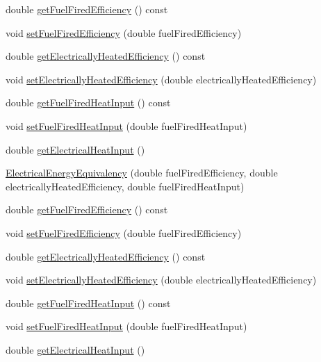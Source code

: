 \begin{DoxyCompactItemize}
\item 
double \hyperlink{class_electrical_energy_equivalency_adc8def25354f6ba8c3479040507b0ea6}{get\+Fuel\+Fired\+Efficiency} () const
\item 
void \hyperlink{class_electrical_energy_equivalency_ac73a4dadfeeff737a24b58e805ce9a3a}{set\+Fuel\+Fired\+Efficiency} (double fuel\+Fired\+Efficiency)
\item 
double \hyperlink{class_electrical_energy_equivalency_a83438510f522aa045f4b1007fca1d2fd}{get\+Electrically\+Heated\+Efficiency} () const
\item 
void \hyperlink{class_electrical_energy_equivalency_ab9091e720096a4c088cece14e975ccb4}{set\+Electrically\+Heated\+Efficiency} (double electrically\+Heated\+Efficiency)
\item 
double \hyperlink{class_electrical_energy_equivalency_acb07f4cd7d416922bc355b2f1b3aadb4}{get\+Fuel\+Fired\+Heat\+Input} () const
\item 
void \hyperlink{class_electrical_energy_equivalency_a9daf2b93c52c31cb999e5a9a18f1dd54}{set\+Fuel\+Fired\+Heat\+Input} (double fuel\+Fired\+Heat\+Input)
\item 
double \hyperlink{class_electrical_energy_equivalency_aac8365a7d5b4e111ddbe7fc0c9beecc7}{get\+Electrical\+Heat\+Input} ()
\item 
\hyperlink{class_electrical_energy_equivalency_aeec1363ce72c89b00aade01a93200e06}{Electrical\+Energy\+Equivalency} (double fuel\+Fired\+Efficiency, double electrically\+Heated\+Efficiency, double fuel\+Fired\+Heat\+Input)
\item 
double \hyperlink{class_electrical_energy_equivalency_adc8def25354f6ba8c3479040507b0ea6}{get\+Fuel\+Fired\+Efficiency} () const
\item 
void \hyperlink{class_electrical_energy_equivalency_ac73a4dadfeeff737a24b58e805ce9a3a}{set\+Fuel\+Fired\+Efficiency} (double fuel\+Fired\+Efficiency)
\item 
double \hyperlink{class_electrical_energy_equivalency_a83438510f522aa045f4b1007fca1d2fd}{get\+Electrically\+Heated\+Efficiency} () const
\item 
void \hyperlink{class_electrical_energy_equivalency_ab9091e720096a4c088cece14e975ccb4}{set\+Electrically\+Heated\+Efficiency} (double electrically\+Heated\+Efficiency)
\item 
double \hyperlink{class_electrical_energy_equivalency_acb07f4cd7d416922bc355b2f1b3aadb4}{get\+Fuel\+Fired\+Heat\+Input} () const
\item 
void \hyperlink{class_electrical_energy_equivalency_a9daf2b93c52c31cb999e5a9a18f1dd54}{set\+Fuel\+Fired\+Heat\+Input} (double fuel\+Fired\+Heat\+Input)
\item 
double \hyperlink{class_electrical_energy_equivalency_aac8365a7d5b4e111ddbe7fc0c9beecc7}{get\+Electrical\+Heat\+Input} ()
\end{DoxyCompactItemize}


